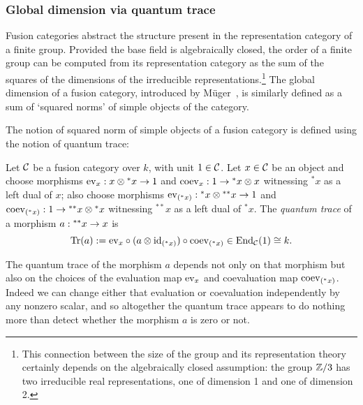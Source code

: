 \documentclass{amsart}
\begin{document}
\subsubsection{Global dimension via quantum trace} \label{sec:gdim}

Fusion categories abstract the structure present in the representation category of a finite group.  Provided the base field is algebraically closed, the order of a finite group can be computed from its representation category as the sum of the squares of the dimensions of the irreducible representations.\footnote{This connection between the size of the group and its representation theory certainly depends on the algebraically closed assumption: the group $\mathbb Z/3$ has two irreducible real representations, one of dimension 1 and one of dimension 2.}  The global dimension of a fusion category, introduced by M\"uger~\cite{MR1966524}, is similarly defined as a sum of `squared norms' of simple objects of the category.  

The notion of squared norm of simple objects of a fusion category is defined using the notion of quantum trace:
\begin{definition}
Let $\mathcal C$ be a fusion category over $k$, with unit $1 \in \mathcal C$.  Let $x \in \mathcal C$ be an object and choose morphisms $\mathrm{ev}_x: x \otimes {}^* x \rightarrow 1$ and $\mathrm{coev}_x : 1 \rightarrow {}^* x \otimes x$ witnessing ${}^* x$ as a left dual of $x$; also choose morphisms $\mathrm{ev}_{({}^* x)} : {}^* x \otimes {}^{**} x \rightarrow 1$ and $\mathrm{coev}_{({}^* x)}: 1 \rightarrow {}^{**} x \otimes {}^* x$ witnessing ${}^{**} x$ as a left dual of ${}^* x$.  The \emph{quantum trace} of a morphism $a: {}^{**} x \rightarrow x$ is
\[
\mathrm{Tr}(a) := \mathrm{ev}_x \circ (a \otimes \mathrm{id}_{({}^* x)}) \circ \mathrm{coev}_{({}^* x)} \in \operatorname{End}_{\mathcal C}(1) \cong k.
\]
\end{definition}
\nid The quantum trace of the morphism $a$ depends not only on that morphism but also on the choices of the evaluation map $\mathrm{ev}_x$ and coevaluation map $\mathrm{coev}_{({}^* x)}$.  Indeed we can change either that evaluation or coevaluation independently by any nonzero scalar, and so altogether the quantum trace appears to do nothing more than detect whether the morphism $a$ is zero or not.  
\end{document}
